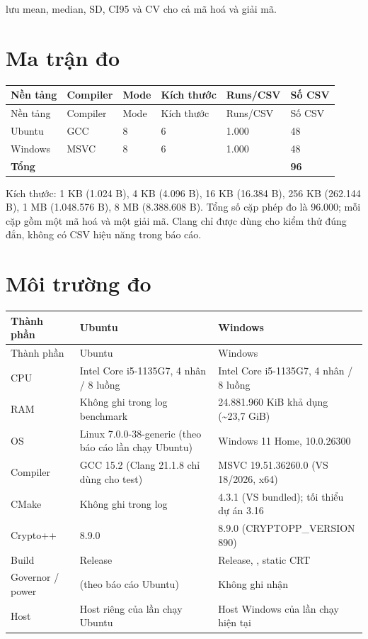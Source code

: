 \documentclass[12pt,a4paper,oneside]{report}
\let\origtexttt\texttt
\renewcommand{\texttt}[1]{\origtexttt{\seqsplit{#1}}}
\begin{document}
\texttt{summary.csv} lưu mean, median, SD, CI95 và CV cho cả mã hoá và giải mã.


\section{Ma trận đo}


\begin{longtable}{p{}p{}p{}p{}p{}p{}}
\toprule
Nền tảng & Compiler & Mode & Kích thước & Runs/CSV & Số CSV \\
\midrule
\endfirsthead
\toprule
Nền tảng & Compiler & Mode & Kích thước & Runs/CSV & Số CSV \\
\midrule
\endhead
Ubuntu & GCC & 8 & 6 & 1.000 & 48 \\
Windows & MSVC & 8 & 6 & 1.000 & 48 \\
\textbf{Tổng} &  &  &  &  & \textbf{96} \\
\bottomrule
\end{longtable}


Kích thước: 1 KB (1.024 B), 4 KB (4.096 B), 16 KB (16.384 B), 256 KB (262.144 B), 1 MB (1.048.576 B), 8 MB (8.388.608 B). Tổng số cặp phép đo là 96.000; mỗi cặp gồm một mã hoá và một giải mã. Clang chỉ được dùng cho kiểm thử đúng đắn, không có CSV hiệu năng trong báo cáo.


\section{Môi trường đo}


\begin{longtable}{p{}p{}p{}}
\toprule
Thành phần & Ubuntu & Windows \\
\midrule
\endfirsthead
\toprule
Thành phần & Ubuntu & Windows \\
\midrule
\endhead
CPU & Intel Core i5-1135G7, 4 nhân / 8 luồng & Intel Core i5-1135G7, 4 nhân / 8 luồng \\
RAM & Không ghi trong log benchmark & 24.881.960 KiB khả dụng (\textasciitilde{}23,7 GiB) \\
OS & Linux 7.0.0-38-generic (theo báo cáo lần chạy Ubuntu) & Windows 11 Home, 10.0.26300 \\
Compiler & GCC 15.2 (Clang 21.1.8 chỉ dùng cho test) & MSVC 19.51.36260.0 (VS 18/2026, x64) \\
CMake & Không ghi trong log & 4.3.1 (VS bundled); tối thiểu dự án 3.16 \\
Crypto++ & 8.9.0 & 8.9.0 (CRYPTOPP\_VERSION 890) \\
Build & Release & Release, \texttt{/O2 /Ob2}, static CRT \texttt{/MT} \\
Governor / power & \texttt{powersave} (theo báo cáo Ubuntu) & Không ghi nhận \\
Host & Host riêng của lần chạy Ubuntu & Host Windows của lần chạy hiện tại \\
\bottomrule
\end{longtable}
\end{document}
